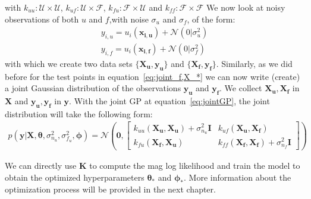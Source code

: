 \documentclass{article}
\begin{document}
with $k_{uu}: \mathcal{U} \times  \mathcal{U}$, $k_{uf}: \mathcal{U} \times  \mathcal{F}$, $k_{fu}: \mathcal{F} \times  \mathcal{U}$ and $k_{ff}: \mathcal{F} \times  \mathcal{F}$
We now look at noisy observations of both $u$ and $f$,with noise $\sigma_u$ and $\sigma_f$, of the form:
\begin{equation}
    \begin{aligned}
        y_{i,u} = u_i(\bm{x_{i,u}}) + \mathcal{N}(0|\sigma_u^2) \\
        y_{i,f} = u_i(\bm{x_{i,f}}) + \mathcal{N}(0|\sigma_f^2)
    \end{aligned}
\end{equation}
with which we create two data sets $\{\bm{X_u,y_u}\}$ and $\{\bm{X_f,y_f}\}$. Similarly, as we did before for the test points in equation~\ref{eq:joint_f,X_*} we can now write (create) a joint Gaussian distribution of the observations $\bm{y_u}$ and $\bm{y_f}$. We collect $\bm{X_u,X_f}$ in $\bm{X}$ and $\bm{y_u,y_f}$ in $\bm{y}$. With the joint GP at equation~\ref{eq:jointGP}, the joint distribution will take the following form:
\begin{equation}
    \label{eq:jointGP_observations}
    \begin{aligned}
        p(\bm{y}|\bm{X},\bm{\theta},\sigma_{n_u}^2,\sigma_{f_u}^2,\bm{\phi}) =
        \mathcal{N}\left(\bm{0},
        \begin{bmatrix}
            k_{uu}(\bm{X_u,X_u}) + \sigma_{n_u}^2 \bm{I} & k_{uf}(\bm{X_u,X_f})                         \\
            k_{fu}(\bm{X_f,X_u})                         & k_{ff}(\bm{X_f,X_f}) + \sigma_{n_f}^2 \bm{I}
        \end{bmatrix}\right)
    \end{aligned}
\end{equation}

We can directly use $\bm{K}$ to compute the mag log likelihood and train the
model to obtain the optimized hyperparameters $\bm{\theta_*}$ and
$\bm{\phi_*}$. More information about the optimization process will be provided
in the next chapter.
\end{document}
